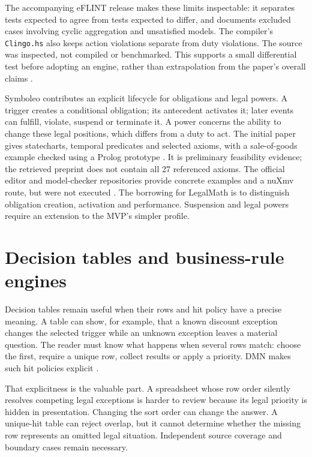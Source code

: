 \documentclass[12pt,a4paper,oneside,openany]{book}
\begin{document}
The accompanying eFLINT release makes these limits inspectable: it separates
tests expected to agree from tests expected to differ, and documents excluded
cases involving cyclic aggregation and unsatisfied models. The compiler's
\texttt{Clingo.hs} also keeps action violations separate from duty violations.
The source was inspected, not compiled or benchmarked. This supports a small
differential test before adopting an engine, rather than extrapolation from the
paper's overall claims \citep{eflintartifact}.

Symboleo contributes an explicit lifecycle for obligations and legal powers.
A trigger creates a conditional obligation; its antecedent activates it; later
events can fulfill, violate, suspend or terminate it. A power concerns the ability
to change these legal positions, which differs from a duty to act. The initial
paper gives statecharts, temporal predicates and selected axioms, with a
sale-of-goods example checked using a Prolog prototype
\citep[secs.~III--IV]{symboleo2020}. It is preliminary feasibility evidence;
the retrieved preprint does not contain all 27 referenced axioms. The official
editor and model-checker repositories provide concrete examples and a nuXmv
route, but were not executed \citep{symboleocode}. The borrowing for LegalMath
is to distinguish obligation creation, activation and performance. Suspension
and legal powers require an extension to the MVP's simpler profile.

\section{Decision tables and business-rule engines}
\label{merge:M04:09}

\label{sec:languages-tables}
Decision tables remain useful when their rows and hit policy have a precise
meaning. A table can show, for example, that a known discount exception changes
the selected trigger while an unknown exception leaves a material question.
The reader must know what happens when several rows match: choose the first,
require a unique row, collect results or apply a priority. DMN makes such hit
policies explicit \citep[sec.~8.2.11]{dmn2024}.

That explicitness is the valuable part. A spreadsheet whose row order silently
resolves competing legal exceptions is harder to review because its legal
priority is hidden in presentation. Changing the sort order can change the
answer. A unique-hit table can reject overlap, but it cannot determine whether
the missing row represents an omitted legal situation. Independent source
coverage and boundary cases remain necessary.
\end{document}

